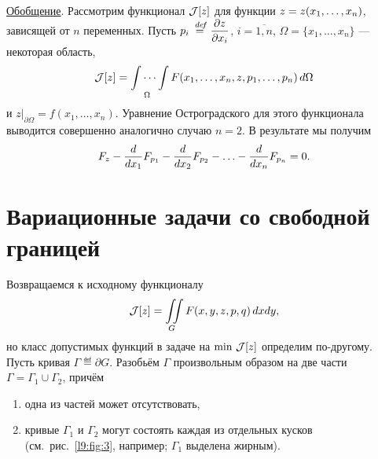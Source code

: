 \noindent\underline{Обобщение}. Рассмотрим функционал $\mathcal{J}[z]$ для функции $z\?=z(x_1,\ldots,x_n)$, зависящей от $n$ переменных. Пусть $\displaystyle p_i\stackrel{\hspace{0.09 cm}de\!f}{=}\frac{\partial z}{\partial x_i}$, $i=\overline{1,n}$, $\Omega=\{x_1,\ldots,x_n\}$ --- некоторая область,
\begin{equation*}
	\mathcal{J}[z]=\idotsint\limits_{\Omega}F(x_1,\ldots,x_n,z,p_1,\ldots,p_n)\,d\Omega
\end{equation*}
и $z\Big|_{\partial\Omega}=f(x_1,\ldots,x_n)$. Уравнение Остроградского для этого функционала выводится совершенно аналогично случаю $n=2$. В результате мы получим 
\begin{equation*}
	 F_z-\frac{d}{dx_1}F_{p_1}-\frac{d}{dx_2}F_{p_2}-\ldots-\frac{d}{dx_n}F_{p_n}=0.
\end{equation*}
\section{Вариационные задачи со свободной границей}
\label{lecture9section3}
Возвращаемся к исходному функционалу
\begin{equation*}
	\mathcal{J}[z]=\iint\limits_{G}F(x,y,z,p,q)\,dxdy,
\end{equation*}
но класс допустимых функций в задаче на $\min\,\mathcal{J}[z]$ определим по-другому. Пусть кривая $\Gamma\eqdef\partial G$. Разобьём $\Gamma$ произвольным образом на две части $\Gamma=\Gamma_1\cup \Gamma_2$, причём 
\begin{enumerate}
	\item одна из частей может отсутствовать,
	\item кривые $\Gamma_1$ и $\Gamma_2$ могут состоять каждая из отдельных кусков (см.~рис.~\ref{l9:fig:3}, например; $\Gamma_1$ выделена жирным).
\end{enumerate} 
